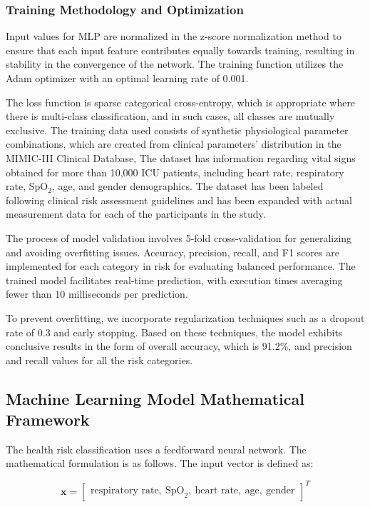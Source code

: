 \documentclass{ieeeaccess}
\begin{document}
\subsubsection{Training Methodology and Optimization}
Input values for MLP are normalized in the z-score normalization method to ensure that each input feature contributes equally towards training, resulting in stability in the convergence of the network. The training function utilizes the Adam optimizer with an optimal learning rate of 0.001.

The loss function is sparse categorical cross-entropy, which is appropriate where there is multi-class classification, and in such cases, all classes are mutually exclusive. The training data used consists of synthetic physiological parameter combinations, which are created from clinical parameters’ distribution in the MIMIC-III Clinical Database\cite{b36}, The dataset has information regarding vital signs obtained for more than 10,000 ICU patients, including heart rate, respiratory rate, SpO$_2$, age, and gender demographics. The dataset has been labeled following clinical risk assessment guidelines and has been expanded with actual measurement data for each of the participants in the study.

The process of model validation involves 5-fold cross-validation for generalizing and avoiding overfitting issues. Accuracy, precision, recall, and F1 scores are implemented for each category in risk for evaluating balanced performance. The trained model facilitates real-time prediction, with execution times averaging fewer than 10 milliseconds per prediction.

To prevent overfitting, we incorporate regularization techniques such as a dropout rate of 0.3 and early stopping. Based on these techniques, the model exhibits conclusive results in the form of overall accuracy, which is 91.2\%, and precision and recall values for all the risk categories.



\subsection{Machine Learning Model Mathematical Framework}
The health risk classification uses a feedforward neural network. The mathematical formulation is as follows. The input vector is defined as:

\[
\mathbf{x} =
\begin{bmatrix}
\text{respiratory rate},\ \text{SpO}_2,\ \text{heart rate},\ \text{age},\ \text{gender}
\end{bmatrix}^T
\]
\end{document}
